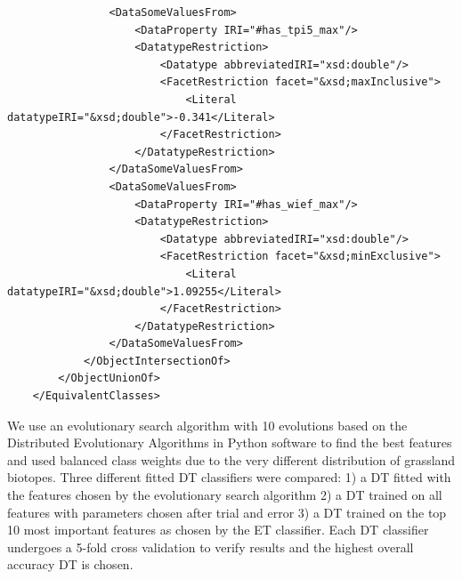 \documentclass[authoryear, review,12pt,number]{elsarticle}
\begin{document}
\begin{lstlisting}
                <DataSomeValuesFrom>
                    <DataProperty IRI="#has_tpi5_max"/>
                    <DatatypeRestriction>
                        <Datatype abbreviatedIRI="xsd:double"/>
                        <FacetRestriction facet="&xsd;maxInclusive">
                            <Literal datatypeIRI="&xsd;double">-0.341</Literal>
                        </FacetRestriction>
                    </DatatypeRestriction>
                </DataSomeValuesFrom>
                <DataSomeValuesFrom>
                    <DataProperty IRI="#has_wief_max"/>
                    <DatatypeRestriction>
                        <Datatype abbreviatedIRI="xsd:double"/>
                        <FacetRestriction facet="&xsd;minExclusive">
                            <Literal datatypeIRI="&xsd;double">1.09255</Literal>
                        </FacetRestriction>
                    </DatatypeRestriction>
                </DataSomeValuesFrom>
            </ObjectIntersectionOf>
        </ObjectUnionOf>
    </EquivalentClasses>
\end{lstlisting}
We use an evolutionary search algorithm with 10 evolutions based on the 
Distributed Evolutionary Algorithms in Python \citep{DEAP_JMLR2012} software to 
find the best features and used balanced class weights due to the very 
different distribution of grassland biotopes.  Three different fitted DT 
classifiers were compared: 1) a DT fitted with the features chosen by the 
evolutionary search algorithm 2) a DT trained on all features with parameters 
chosen after trial and error 3) a DT trained on the top 10 most important 
features as chosen by the ET classifier. Each DT classifier undergoes a 5-fold 
cross validation to verify results and the highest overall accuracy DT is 
chosen.




\end{document}
